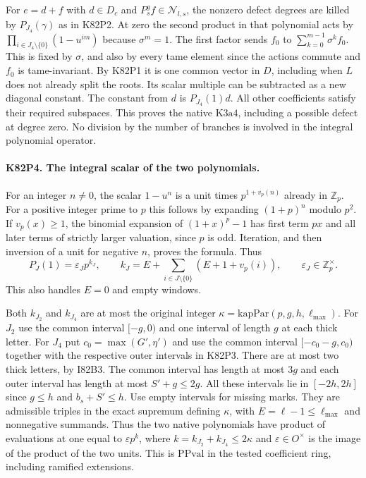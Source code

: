 For $e=d+f$ with $d\in D_c$ and $P_s^g f\in\mathcal N_{l,s}$,
the nonzero defect degrees are killed by $P_{J_4}(\gamma)$ as
in K82P2. At zero the second product in that polynomial acts
by $\prod_{i\in J_4\setminus\{0\}}(1-u^{im})$ because
$\sigma^m=1$. The first factor sends $f_0$ to
$\sum_{k=0}^{m-1}\sigma^kf_0$. This is fixed by $\sigma$,
and also by every tame element since the actions commute and
$f_0$ is tame-invariant. By K82P1 it is one common vector in
$D$, including when $L$ does not already split the roots.
Its scalar multiple can be subtracted as a new diagonal
constant. The constant from $d$ is $P_{J_4}(1)d$.
All other coefficients satisfy their required subspaces.
This proves the native $\mathrm{K3a4}$, including a possible
defect at degree zero. No division by the number of branches
is involved in the integral polynomial operator.

\paragraph{K82P4. The integral scalar of the two polynomials.}
For an integer $n\ne0$, the scalar $1-u^n$ is a unit times
$p^{1+v_p(n)}$ already in $\mathbb Z_p$. For a positive integer
prime to $p$ this follows by expanding $(1+p)^n$ modulo $p^2$.
If $v_p(x)\ge1$, the binomial expansion of $(1+x)^p-1$ has
first term $px$ and all later terms of strictly larger valuation,
since $p$ is odd. Iteration, and then inversion of a unit for
negative $n$, proves the formula. Thus
\[
 P_J(1)=\varepsilon_J p^{k_J},\qquad
 k_J=E+\sum_{i\in J\setminus\{0\}}(E+1+v_p(i)),
 \qquad \varepsilon_J\in\mathbb Z_p^\times .
\]
This also handles $E=0$ and empty windows.

Both $k_{J_2}$ and $k_{J_4}$ are at most the original integer
$\kappa=\mathrm{kapPar}(p,g,h,\ell_{\max})$. For $J_2$ use the
common interval $[-g,0)$ and one interval of length $g$ at
each thick letter. For $J_4$ put $c_0=\max(G',\eta')$ and use
the common interval $[-c_0-g,c_0)$ together with the respective
outer intervals in K82P3. There are at most two thick letters,
by I82B3. The common interval has length at most $3g$ and
each outer interval has length at most $S'+g\le2g$. All
these intervals lie in $[-2h,2h]$ since $g\le h$ and
$b_s+S'\le h$. Use empty intervals for missing marks.
They are admissible triples in the exact supremum defining
$\kappa$, with $E=\ell-1\le\ell_{\max}$ and nonnegative
summands. Thus the two native polynomials have product of
evaluations at one equal to $\varepsilon p^k$, where
$k=k_{J_2}+k_{J_4}\le2\kappa$ and $\varepsilon\in O^\times$
is the image of the product of the two units. This is
$\mathrm{PPval}$ in the tested coefficient ring, including
ramified extensions.
